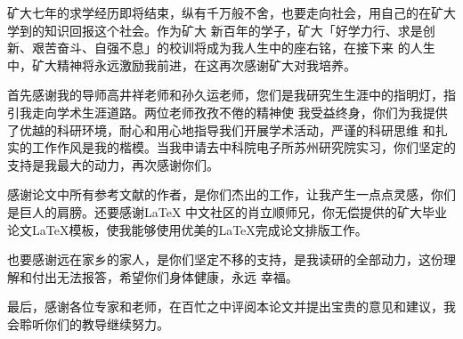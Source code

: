 \begin{acknowledgements}
	矿大七年的求学经历即将结束，纵有千万般不舍，也要走向社会，用自己的在矿大学到的知识回报这个社会。作为矿大
	新百年的学子，矿大「好学力行、求是创新、艰苦奋斗、自强不息」的校训将成为我人生中的座右铭，在接下来
	的人生中，矿大精神将永远激励我前进，在这再次感谢矿大对我培养。
	
	首先感谢我的导师高井祥老师和孙久运老师，您们是我研究生生涯中的指明灯，指引我走向学术生涯道路。两位老师孜孜不倦的精神使
	我受益终身，你们为我提供了优越的科研环境，耐心和用心地指导我们开展学术活动，严谨的科研思维
	和扎实的工作作风是我的楷模。当我申请去中科院电子所苏州研究院实习，你们坚定的支持是我最大的动力，再次感谢你们。
	
	感谢论文中所有参考文献的作者，是你们杰出的工作，让我产生一点点灵感，你们是巨人的肩膀。还要感谢\LaTeX
	中文社区的肖立顺师兄，你无偿提供的矿大毕业论文\LaTeX{}模板，使我能够使用优美的\LaTeX{}完成论文排版工作。
	
	也要感谢远在家乡的家人，是你们坚定不移的支持，是我读研的全部动力，这份理解和付出无法报答，希望你们身体健康，永远
	幸福。
	
	最后，感谢各位专家和老师，在百忙之中评阅本论文并提出宝贵的意见和建议，我会聆听你们的教导继续努力。
\end{acknowledgements}

